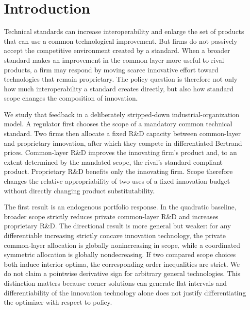 \section{Introduction}

Technical standards can increase interoperability and enlarge the set of products that can use a common technological improvement. But firms do not passively accept the competitive environment created by a standard. When a broader standard makes an improvement in the common layer more useful to rival products, a firm may respond by moving scarce innovative effort toward technologies that remain proprietary. The policy question is therefore not only how much interoperability a standard creates directly, but also how standard scope changes the composition of innovation.

We study that feedback in a deliberately stripped-down industrial-organization model. A regulator first chooses the scope of a mandatory common technical standard. Two firms then allocate a fixed R\&D capacity between common-layer and proprietary innovation, after which they compete in differentiated Bertrand prices. Common-layer R\&D improves the innovating firm's product and, to an extent determined by the mandated scope, the rival's standard-compliant product. Proprietary R\&D benefits only the innovating firm. Scope therefore changes the relative appropriability of two uses of a fixed innovation budget without directly changing product substitutability.

The first result is an endogenous portfolio response. In the quadratic baseline, broader scope strictly reduces private common-layer R\&D and increases proprietary R\&D. The directional result is more general but weaker: for any differentiable increasing strictly concave innovation technology, the private common-layer allocation is globally nonincreasing in scope, while a coordinated symmetric allocation is globally nondecreasing. If two compared scope choices both induce interior optima, the corresponding order inequalities are strict. We do not claim a pointwise derivative sign for arbitrary general technologies. This distinction matters because corner solutions can generate flat intervals and differentiability of the innovation technology alone does not justify differentiating the optimizer with respect to policy.

